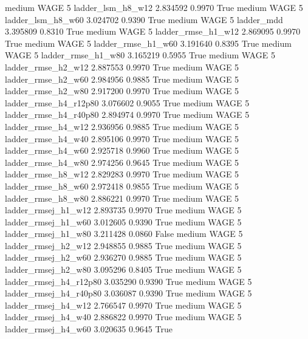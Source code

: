     medium     WAGE                 5      ladder_lsm_h8_w12   2.834592      0.9970    True
    medium     WAGE                 5      ladder_lsm_h8_w60   3.024702      0.9390    True
    medium     WAGE                 5             ladder_mdd   3.395809      0.8310    True
    medium     WAGE                 5     ladder_rmse_h1_w12   2.869095      0.9970    True
    medium     WAGE                 5     ladder_rmse_h1_w60   3.191640      0.8395    True
    medium     WAGE                 5     ladder_rmse_h1_w80   3.165219      0.5955    True
    medium     WAGE                 5     ladder_rmse_h2_w12   2.887553      0.9970    True
    medium     WAGE                 5     ladder_rmse_h2_w60   2.984956      0.9885    True
    medium     WAGE                 5     ladder_rmse_h2_w80   2.917200      0.9970    True
    medium     WAGE                 5  ladder_rmse_h4_r12p80   3.076602      0.9055    True
    medium     WAGE                 5  ladder_rmse_h4_r40p80   2.894974      0.9970    True
    medium     WAGE                 5     ladder_rmse_h4_w12   2.936956      0.9885    True
    medium     WAGE                 5     ladder_rmse_h4_w40   2.895106      0.9970    True
    medium     WAGE                 5     ladder_rmse_h4_w60   2.925718      0.9960    True
    medium     WAGE                 5     ladder_rmse_h4_w80   2.974256      0.9645    True
    medium     WAGE                 5     ladder_rmse_h8_w12   2.829283      0.9970    True
    medium     WAGE                 5     ladder_rmse_h8_w60   2.972418      0.9855    True
    medium     WAGE                 5     ladder_rmse_h8_w80   2.886221      0.9970    True
    medium     WAGE                 5    ladder_rmsej_h1_w12   2.893735      0.9970    True
    medium     WAGE                 5    ladder_rmsej_h1_w60   3.012605      0.9390    True
    medium     WAGE                 5    ladder_rmsej_h1_w80   3.211428      0.0860   False
    medium     WAGE                 5    ladder_rmsej_h2_w12   2.948855      0.9885    True
    medium     WAGE                 5    ladder_rmsej_h2_w60   2.936270      0.9885    True
    medium     WAGE                 5    ladder_rmsej_h2_w80   3.095296      0.8405    True
    medium     WAGE                 5 ladder_rmsej_h4_r12p80   3.035290      0.9390    True
    medium     WAGE                 5 ladder_rmsej_h4_r40p80   3.036087      0.9390    True
    medium     WAGE                 5    ladder_rmsej_h4_w12   2.766547      0.9970    True
    medium     WAGE                 5    ladder_rmsej_h4_w40   2.886822      0.9970    True
    medium     WAGE                 5    ladder_rmsej_h4_w60   3.020635      0.9645    True
